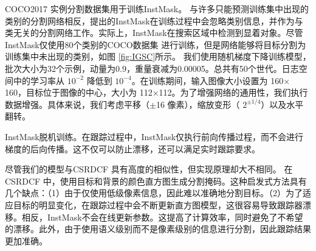 COCO2017 \cite{COCO} 实例分割数据集用于训练InstMask。
与许多只能预测训练集中出现的类别的分割网络相反，提出的InstMask在训练过程中会忽略类别信息，并作为与类无关的分割网络工作。实际上，InstMask在搜索区域中检测到显着对象。尽管InstMask仅使用80个类别的COCO数据集 \cite{COCO} 进行训练，但是网络能够将目标分割为训练集中未出现的类别，如图 \ref{fig:IGSC}所示。
我们使用随机梯度下降训练模型，批次大小为32个示例，动量为0.9，重量衰减为0.00005。总共有50个世代。日志空间中的学习率从 $10^{-2}$ 降低到 $10^{-4}$。在训练期间，输入图像大小设置为 160$\times$160，目标位于图像的中心，大小为 112$\times$112。为了增强网络的通用性，我们执行数据增强。具体来说，我们考虑平移（$\pm$16 像素），缩放变形（ $2^{\pm 1/4}$）以及水平翻转。

InstMask脱机训练。在跟踪过程中，InstMask仅执行前向传播过程，而不会进行梯度的后向传播。这不仅可以防止漂移，还可以满足实时跟踪要求。

尽管我们的模型与CSRDCF \cite{Lukezic2017DiscriminativeCF}具有高度的相似性，但实现原理却大不相同。
在CSRDCF \cite{Lukezic2017DiscriminativeCF}中，使用目标和背景的颜色直方图生成分割掩码。这种启发式方法具有几个缺点：（1）由于仅使用低级像素信息，因此难以准确地分割目标。（2）为了适应目标的明显变化，在跟踪过程中会不断更新直方图模型，这很容易导致跟踪器漂移。相反，InstMask不会在线更新参数。这提高了计算效率，同时避免了不希望的漂移。此外，由于使用语义级别而不是像素级别的信息进行分割，因此跟踪结果更加准确。

